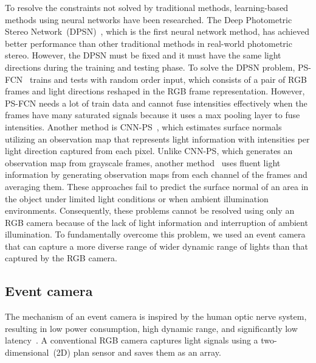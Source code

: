 To resolve the constraints not solved by traditional methods, learning-based methods using neural networks have been researched. The Deep Photometric Stereo Network~(DPSN)~\citep{santo2017deep}, which is the first neural network method, has achieved better performance than other traditional methods in real-world photometric stereo. However, the DPSN must be fixed and it must have the same light directions during the training and testing phase. To solve the DPSN problem, PS-FCN~\citep{chen2018ps} trains and tests with random order input, which consists of a pair of RGB frames and light directions reshaped in the RGB frame representation. However, PS-FCN needs a lot of train data and cannot fuse intensities effectively when the frames have many saturated signals because it uses a max pooling layer to fuse intensities. Another method is CNN-PS~\citep{ikehata2018cnn}, which estimates surface normals utilizing an observation map that represents light information with intensities per light direction captured from each pixel. Unlike CNN-PS, which generates an observation map from grayscale frames, another method~\citep{logothetis2021px} uses fluent light information by generating observation maps from each channel of the frames and averaging them. These approaches fail to predict the surface normal of an area in the object under limited light conditions or when ambient illumination environments. Consequently, these problems cannot be resolved using only an RGB camera because of the lack of light information and interruption of ambient illumination. To fundamentally overcome this problem, we used an event camera that can capture a more diverse range of wider dynamic range of lights than that captured by the RGB camera.

\subsection{Event camera}
The mechanism of an event camera is inspired by the human optic nerve system, resulting in low power consumption, high dynamic range, and significantly low latency~\citep{gallego2020event}. A conventional RGB camera captures light signals using a two-dimensional~(2D) plan sensor and saves them as an array.

